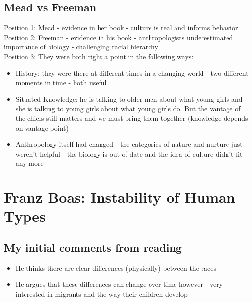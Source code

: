 \documentclass{article}
\begin{document}
\subsection{Mead vs Freeman}
Position 1: Mead - evidence in her book - culture is real and informs behavior \\ 
Position 2: Freeman - evidence in his book - anthropologists underestimated importance of biology - challenging racial hierarchy \\
Position 3: They were both right a point in the following ways:
\begin{itemize}
\item History: they were there at different times in a changing world - two different moments in time - both useful
\item Situated Knowledge: he is talking to older men about what young girls and she is talking to young girls about what young girls do. But the vantage of the chiefs still matters and we must bring them together (knowledge depends on vantage point)
\item Anthropology itself had changed - the categories of nature and nurture just weren't helpful - the biology is out of date and the idea of culture didn't fit any more
\end{itemize}

\section{Franz Boas: Instability of Human Types}
\subsection{My initial comments from reading}
\begin{itemize}
\item He thinks there are clear differences (physically) between the races
\item He argues that these differences can change over time however - very interested in migrants and the way their children develop
\end{itemize}
\end{document}

